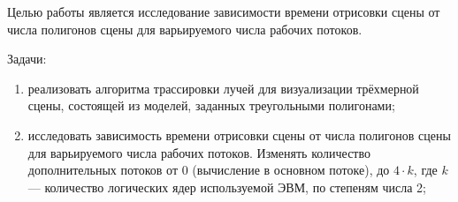 
Целью работы является исследование зависимости времени отрисовки сцены от числа полигонов сцены для варьируемого числа рабочих потоков.

Задачи:
\begin{enumerate}[label={\arabic*)}]
	\item реализовать алгоритма трассировки лучей для визуализации трёхмерной сцены, состоящей из моделей, заданных треугольными полигонами;
	\item исследовать зависимость времени отрисовки сцены от числа полигонов сцены для варьируемого числа рабочих потоков. Изменять количество дополнительных потоков от 0 (вычисление в основном потоке), до $4\cdot k$, где $k$ --- количество логических ядер используемой ЭВМ, по степеням числа 2;
\end{enumerate}

\clearpage
